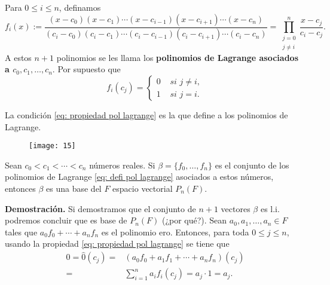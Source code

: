 Para $0 \leq i \leq n$, definamos
\begin{equation}
	\label{eq: defi pol lagrange}
	f_{i}(x) := \frac{
	(x-c_{0}) (x-c_{1}) \cdots (x-c_{i-1})
	(x-c_{i+1}) \cdots (x-c_{n})
	}{(c_{i} - c_{0}) (c_{i}-c_{1}) \cdots
	(c_{i}-c_{i-1})(c_{i}-c_{i+1}) \cdots (c_{i}-c_{n}) }
	= \prod_{\substack{j=0 \\ j \neq i}}^{n} \frac{x-c_{j}}{c_{i}-c_{j}}.
\end{equation}
A estos $n+1$ polinomios se les llama los
\textbf{polinomios de Lagrange asociados a $c_{0}, c_{1}, \ldots , c_{n}$}.
Por supuesto que 
\begin{equation}
	\label{eq: propiedad pol lagrange}
	f_{i}(c_{j}) 
	= \begin{cases}
	0 & \textit{ si } j \neq i, \\
	1 & \textit{ si } j = i.
	\end{cases}
\end{equation}

La condición \ref{eq: propiedad pol lagrange} es la que define
a los polinomios de Lagrange.

\begin{figure}[H]
	\centering
	\texttt{[image: 15]} 
\end{figure}	



\begin{prop}
Sean $c_{0} < c_{1} < \cdots < c_{n}$ números reales. Si
$\beta = \{ f_{0}, \ldots, f_{n} \}$ es el conjunto de los
polinomios de Lagrange 
\eqref{eq: defi pol lagrange} asociados a estos números,
entonces $\beta$ es una base del $F$ espacio vectorial
$P_{n}(F)$.
\end{prop}
\noindent
\textbf{Demostración.}
Si demostramos que el conjunto de $n+1$ vectores 
$\beta$ es l.i. podremos concluir que es base de
$P_{n}(F)$ (¿por qué?).
Sean $a_{0}, a_{1}, \ldots, a_{n} \in F$ tales que
$a_{0}f_{0} + \cdots + a_{n}f_{n}$ es el polinomio ero.
Entonces, para toda $0 \leq j \leq n$,
usando la propiedad \eqref{eq: propiedad pol lagrange}
se tiene que 
\begin{align*}
0 = \hat{0}(c_{j}) = &
(a_{0}f_{0} + a_{1}f_{1} + \cdots + a_{n}f_{n})(c_{j}) \\
= & \sum_{i=1}^{n} a_{i}f_{i}(c_{j}) = a_{j} \cdot 1 = a_{j}.
\end{align*}

\QEDB
\vspace{0.2cm}



